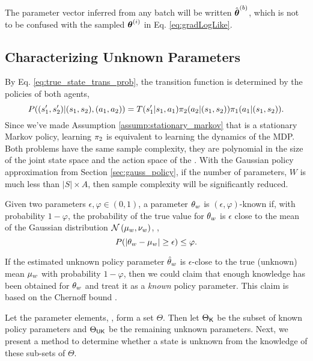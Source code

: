 \begin{remark}
    The parameter vector inferred from any batch will be written $\hat{\boldsymbol{\mathbb{\theta}}}^{(b)}$, which is not to be
    confused with the sampled $\boldsymbol{\mathbb{\theta}}^{(i)}$ in Eq. \ref{eq:gradLogLike}.
\end{remark}


\subsection{Characterizing Unknown Parameters}\label{sec:unknown_params}
By Eq. \ref{eq:true_state_trans_prob}, the transition function is determined by the policies of both agents,
\[
P((s_1',s_2')|(s_1,s_2),(a_1,a_2)) = T(s_1'|s_1,a_1) \pi_{2}(a_2|(s_1,s_2))\pi_{1}(a_1|(s_1,s_2)).
\]
Since we've made Assumption \ref{assump:stationary_markov} that  is a stationary Markov policy, learning
$\pi_{2}$ is equivalent to learning the dynamics of the MDP. Both problems have the same sample complexity, they
are polynomial in the size of the joint state space and the action space of the . With the Gaussian policy
approximation from Section \ref{sec:gauss_policy}, if the number of parameters, $W$ is much less than $|S|\times A$,
then sample complexity will be significantly reduced.

\begin{definition}
        Given two parameters $\epsilon, \varphi \in (0,1)$, a parameter $\theta_{w}$ is $(\epsilon,
        \varphi)$-known if, with probability $1-\varphi$, the probability of the true value for $\theta_{w}$ is
        $\epsilon$ close to the mean of the Gaussian distribution $\mathcal{N}\left(\mu_{w}, \nu_{w}\right)$, \ie,
        \[
        P(\lvert\theta_{w} - \mu_{w}\rvert \ge \epsilon) \le \varphi.
        \]
\end{definition}

If the estimated unknown policy parameter $\hat{\theta}_w$ is $\epsilon$-close to the true (unknown) mean
$\mu_{w}$ with probability $1-\varphi$, then we could claim  that enough knowledge has been obtained for
$\theta_{w}$ and treat it as a \emph{known} policy parameter. This claim is based on the Chernoff bound
\cite{kobayashi2011probability}.

Let the parameter elements, \paramElem, form a set $\Theta$. Then let $\Theta_{\mathsf{K}}$ be the subset of known policy
parameters and $\Theta_{\mathsf{UK}}$ be the remaining unknown parameters.  Next, we present a method to determine whether
a state is unknown from the knowledge of these sub-sets
of $\Theta$.

